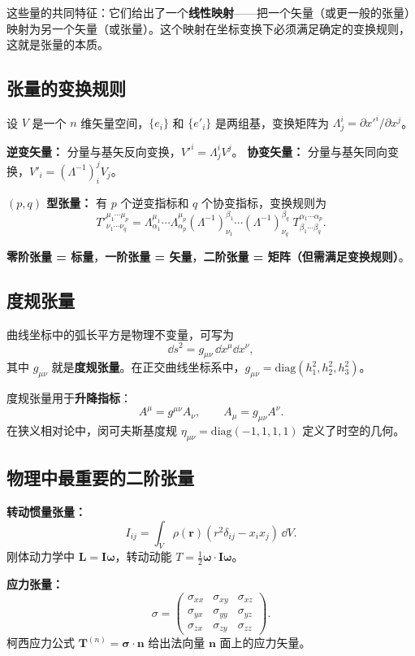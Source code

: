 这些量的共同特征：它们给出了一个\textbf{线性映射}——把一个矢量（或更一般的张量）映射为另一个矢量（或张量）。这个映射在坐标变换下必须满足确定的变换规则，这就是张量的本质。

\subsection{张量的变换规则}

设 $V$ 是一个 $n$ 维矢量空间，$\{e_i\}$ 和 $\{e'_i\}$ 是两组基，变换矩阵为 $\Lambda^i_j = \partial x'^i/\partial x^j$。

\textbf{逆变矢量：} 分量与基矢反向变换，$V'^i = \Lambda^i_j V^j$。
\textbf{协变矢量：} 分量与基矢同向变换，$V'_i = (\Lambda^{-1})^j_i V_j$。

\textbf{$(p,q)$ 型张量：} 有 $p$ 个逆变指标和 $q$ 个协变指标，变换规则为
\[
T'^{\mu_1\cdots\mu_p}_{\nu_1\cdots\nu_q}
= \Lambda^{\mu_1}_{\alpha_1}\cdots\Lambda^{\mu_p}_{\alpha_p}
(\Lambda^{-1})^{\beta_1}_{\nu_1}\cdots(\Lambda^{-1})^{\beta_q}_{\nu_q}
\;T^{\alpha_1\cdots\alpha_p}_{\beta_1\cdots\beta_q}.
\]

\textbf{零阶张量 = 标量}，\textbf{一阶张量 = 矢量}，\textbf{二阶张量 = 矩阵（但需满足变换规则）}。

\subsection{度规张量}

曲线坐标中的弧长平方是物理不变量，可写为
\[
\dd s^2 = g_{\mu\nu}\,\dd x^\mu\dd x^\nu,
\]
其中 $g_{\mu\nu}$ 就是\textbf{度规张量}。在正交曲线坐标系中，$g_{\mu\nu} = \mathrm{diag}(h_1^2, h_2^2, h_3^2)$。

度规张量用于\textbf{升降指标}：
\[
A^\mu = g^{\mu\nu}A_\nu,\qquad A_\mu = g_{\mu\nu}A^\nu.
\]
在狭义相对论中，闵可夫斯基度规 $\eta_{\mu\nu} = \mathrm{diag}(-1,1,1,1)$ 定义了时空的几何。

\subsection{物理中最重要的二阶张量}

\textbf{转动惯量张量：}
\[
I_{ij} = \int_V \rho(\mathbf{r})(r^2\delta_{ij} - x_i x_j)\,\dd V.
\]
刚体动力学中 $\mathbf{L} = \mathbf{I}\bm{\omega}$，转动动能 $T = \frac12\bm{\omega}\cdot\mathbf{I}\bm{\omega}$。

\textbf{应力张量：}
\[
\sigma = \begin{pmatrix}
\sigma_{xx} & \sigma_{xy} & \sigma_{xz} \\
\sigma_{yx} & \sigma_{yy} & \sigma_{yz} \\
\sigma_{zx} & \sigma_{zy} & \sigma_{zz}
\end{pmatrix}.
\]
柯西应力公式 $\mathbf{T}^{(n)} = \bm{\sigma}\cdot\mathbf{n}$ 给出法向量 $\mathbf{n}$ 面上的应力矢量。

